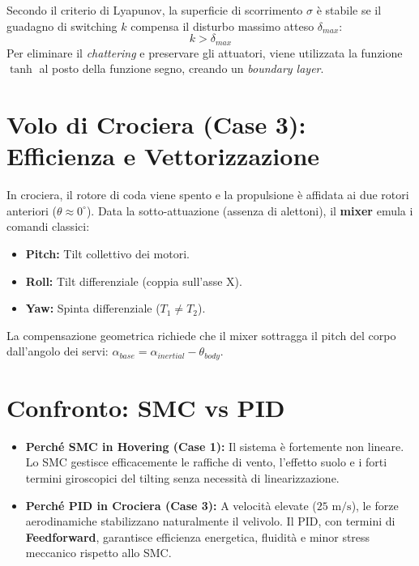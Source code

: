 \documentclass[12pt,a4paper]{article}
\begin{document}
Secondo il criterio di Lyapunov, la superficie di scorrimento $\sigma$ è stabile se il guadagno di switching $k$ compensa il disturbo massimo atteso $\delta_{max}$:
\begin{equation}
k > \delta_{max}
\end{equation}
Per eliminare il \textit{chattering} e preservare gli attuatori, viene utilizzata la funzione $\tanh$ al posto della funzione segno, creando un \textit{boundary layer}.

\section{Volo di Crociera (Case 3): Efficienza e Vettorizzazione}
In crociera, il rotore di coda viene spento e la propulsione è affidata ai due rotori anteriori ($\theta \approx 0^\circ$). Data la sotto-attuazione (assenza di alettoni), il \textbf{mixer} emula i comandi classici:
\begin{itemize}
    \item \textbf{Pitch:} Tilt collettivo dei motori.
    \item \textbf{Roll:} Tilt differenziale (coppia sull'asse X).
    \item \textbf{Yaw:} Spinta differenziale ($T_1 \neq T_2$).
\end{itemize}
La compensazione geometrica richiede che il mixer sottragga il pitch del corpo dall'angolo dei servi: $\alpha_{base} = \alpha_{inertial} - \theta_{body}$.

\section{Confronto: SMC vs PID}
\begin{itemize}
    \item \textbf{Perché SMC in Hovering (Case 1):} Il sistema è fortemente non lineare. Lo SMC gestisce efficacemente le raffiche di vento, l'effetto suolo e i forti termini giroscopici del tilting senza necessità di linearizzazione.
    \item \textbf{Perché PID in Crociera (Case 3):} A velocità elevate ($25 \text{ m/s}$), le forze aerodinamiche stabilizzano naturalmente il velivolo. Il PID, con termini di \textbf{Feedforward}, garantisce efficienza energetica, fluidità e minor stress meccanico rispetto allo SMC.
\end{itemize}
\end{document}
